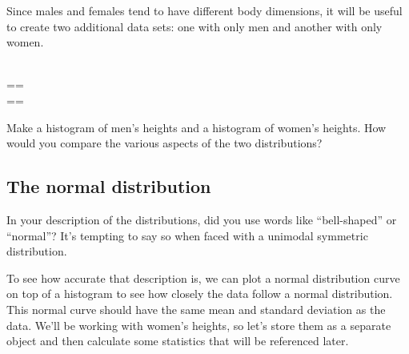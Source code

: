 \documentclass[11pt]{article}
\begin{document}
Since males and females tend to have different body dimensions, it will be useful to create two additional data sets: one with only men and another with only women.

\ttfamily\noindent
\hlstd{}\hspace*{\fill}\\
\hlstd{}\hlassignement{\usebox{\hlnormalsizeboxlessthan}-}{\ }\hlkeyword{(}\hlkeyword{,}{\ }\hlkeyword{\usebox{\hlnormalsizeboxdollar}}=={\ }\hlkeyword{)}\hspace*{\fill}\\
\hlstd{}\hlassignement{\usebox{\hlnormalsizeboxlessthan}-}{\ }\hlkeyword{(}\hlkeyword{,}{\ }\hlkeyword{\usebox{\hlnormalsizeboxdollar}}=={\ }\hlkeyword{)}\hspace*{\fill}\\
\normalfont

\begin{exercise}
Make a histogram of men's heights and a histogram of women's heights.  How would you compare the various aspects of the two distributions?
\end{exercise}

%

\subsection*{The normal distribution}
In your description of the distributions, did you use words like ``bell-shaped'' or ``normal''?  It's tempting to say so when faced with a unimodal symmetric distribution.

To see how accurate that description is, we can plot a normal distribution curve on top of a histogram to see how closely the data follow a normal distribution. This normal curve should have the same mean and standard deviation as the data. We'll be working with women's heights, so let's store them as a separate object and then calculate some statistics that will be referenced later. 

\ttfamily\noindent
\hlstd{}\hspace*{\fill}\\
\hlstd{}\hlassignement{\usebox{\hlnormalsizeboxlessthan}-}{\ }\hlkeyword{\usebox{\hlnormalsizeboxdollar}}\hspace*{\fill}\\
\hlstd{}\hlassignement{\usebox{\hlnormalsizeboxlessthan}-}{\ }\hlkeyword{(}\hlkeyword{)}\hspace*{\fill}\\
\hlstd{}\hlassignement{\usebox{\hlnormalsizeboxlessthan}-}{\ }\hlkeyword{(}\hlkeyword{)}\hspace*{\fill}\\
\normalfont
\end{document}
